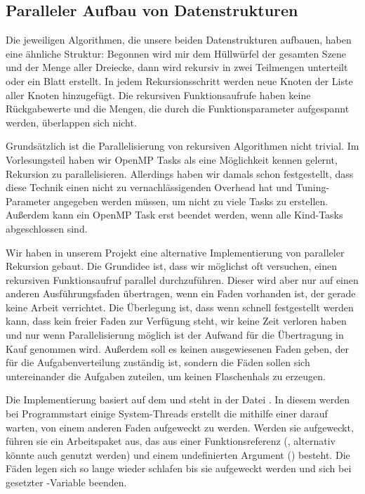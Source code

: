 \subsection{Paralleler Aufbau von Datenstrukturen}

Die jeweiligen Algorithmen, die unsere beiden Datenstrukturen aufbauen, haben eine ähnliche Struktur: Begonnen wird mir dem Hüllwürfel der gesamten Szene und der Menge aller Dreiecke, dann wird rekursiv in zwei Teilmengen unterteilt oder ein Blatt erstellt. In jedem Rekursionsschritt werden neue Knoten der Liste aller Knoten hinzugefügt. Die rekursiven Funktionsaufrufe haben keine Rückgabewerte und die Mengen, die durch die Funktionsparameter aufgespannt werden, überlappen sich nicht.

Grundsätzlich ist die Parallelisierung von rekursiven Algorithmen nicht trivial. Im Vorlesungsteil haben wir OpenMP Tasks als eine Möglichkeit kennen gelernt, Rekursion zu parallelisieren. Allerdings haben wir damals schon festgestellt, dass diese Technik einen nicht zu vernachlässigenden Overhead hat und Tuning-Parameter angegeben werden müssen, um nicht zu viele Tasks zu erstellen. Außerdem kann ein OpenMP Task erst beendet werden, wenn alle Kind-Tasks abgeschlossen sind.

Wir haben in unserem Projekt eine alternative Implementierung von paralleler Rekursion gebaut. Die Grundidee ist, dass wir möglichst oft versuchen, einen rekursiven Funktionsaufruf parallel durchzuführen. Dieser wird aber nur auf einen anderen Ausführungsfaden übertragen, wenn ein Faden vorhanden ist, der gerade keine Arbeit verrichtet. Die Überlegung ist, dass wenn schnell festgestellt werden kann, dass kein freier Faden zur Verfügung steht, wir keine Zeit verloren haben und nur wenn Parallelisierung möglich ist der Aufwand für die Übertragung in Kauf genommen wird. Außerdem soll es keinen ausgewiesenen Faden geben, der für die Aufgabenverteilung zuständig ist, sondern die Fäden sollen sich untereinander die Aufgaben zuteilen, um keinen Flaschenhals zu erzeugen.

Die Implementierung basiert auf dem  und steht in der Datei . In diesem werden bei Programmstart einige System-Threads erstellt die mithilfe einer  darauf warten, von einem anderen Faden aufgeweckt zu werden. Werden sie aufgeweckt, führen sie ein Arbeitspaket aus, das aus einer Funktionsreferenz (, alternativ könnte auch  genutzt werden) und einem undefinierten Argument () besteht. Die Fäden legen sich so lange wieder schlafen bis sie aufgeweckt werden und sich bei gesetzter -Variable beenden.

